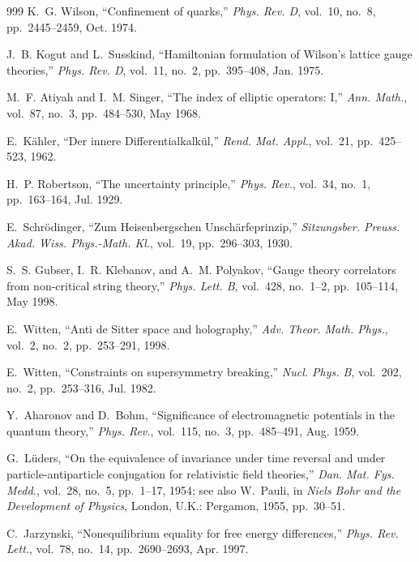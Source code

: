 \documentclass[11pt,letterpaper]{article}
\theoremstyle{spectralthm}
\begin{document}
\begin{thebibliography}{999}
K.~G. Wilson, ``Confinement of quarks,'' \emph{Phys. Rev. D}, vol.~10, no.~8, pp.~2445--2459, Oct. 1974.

J.~B. Kogut and L.~Susskind, ``Hamiltonian formulation of Wilson's lattice gauge theories,'' \emph{Phys. Rev. D}, vol.~11, no.~2, pp.~395--408, Jan. 1975.

M.~F. Atiyah and I.~M. Singer, ``The index of elliptic operators: I,'' \emph{Ann. Math.}, vol.~87, no.~3, pp.~484--530, May 1968.

E.~K\"{a}hler, ``Der innere Differentialkalk\"{u}l,'' \emph{Rend. Mat. Appl.}, vol.~21, pp.~425--523, 1962.

H.~P. Robertson, ``The uncertainty principle,'' \emph{Phys. Rev.}, vol.~34, no.~1, pp.~163--164, Jul. 1929.

E.~Schr\"{o}dinger, ``Zum Heisenbergschen Unsch\"{a}rfeprinzip,'' \emph{Sitzungsber. Preuss. Akad. Wiss. Phys.-Math. Kl.}, vol.~19, pp.~296--303, 1930.

S.~S. Gubser, I.~R. Klebanov, and A.~M. Polyakov, ``Gauge theory correlators from non-critical string theory,'' \emph{Phys. Lett. B}, vol.~428, no.~1--2, pp.~105--114, May 1998.

E.~Witten, ``Anti de Sitter space and holography,'' \emph{Adv. Theor. Math. Phys.}, vol.~2, no.~2, pp.~253--291, 1998.

E.~Witten, ``Constraints on supersymmetry breaking,'' \emph{Nucl. Phys. B}, vol.~202, no.~2, pp.~253--316, Jul. 1982.

Y.~Aharonov and D.~Bohm, ``Significance of electromagnetic potentials in the quantum theory,'' \emph{Phys. Rev.}, vol.~115, no.~3, pp.~485--491, Aug. 1959.

G.~L\"{u}ders, ``On the equivalence of invariance under time reversal and under particle-antiparticle conjugation for relativistic field theories,'' \emph{Dan. Mat. Fys. Medd.}, vol.~28, no.~5, pp.~1--17, 1954; see also W.~Pauli, in \emph{Niels Bohr and the Development of Physics}, London, U.K.: Pergamon, 1955, pp.~30--51.

C.~Jarzynski, ``Nonequilibrium equality for free energy differences,'' \emph{Phys. Rev. Lett.}, vol.~78, no.~14, pp.~2690--2693, Apr. 1997.


\end{thebibliography}
\end{document}
